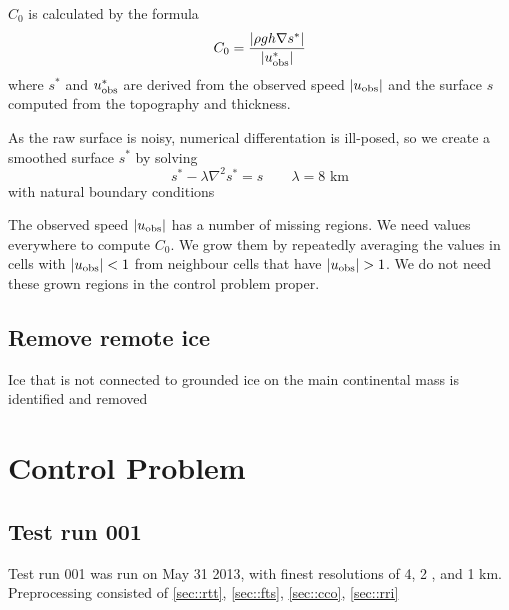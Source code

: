 \documentclass{article}
\newcommand{\usrf}{s}
\newcommand{\thk}{h}
\begin{document}
$C_0$ is calculated by the formula
\begin{equation}
C_0 = \frac{\left | \rho g \thk \nabla{\usrf^{*}}  \right |}{ \left | u_{\rm obs}^{*}  \right | }
\end{equation}
where $\usrf^{*}$ and $u_{\rm obs}^{*}$ are derived from the observed speed $\left| u_{\rm obs} \right |$
and the surface $\usrf$ computed from the topography and thickness.

As the raw surface is noisy, numerical differentation is ill-posed, so we create a smoothed
surface $\usrf^{*}$ by solving
\begin{equation}
\usrf^{*} - \lambda \nabla^2 \usrf^{*} = \usrf \qquad \lambda = 8 \mbox{~km}
\end{equation}
with natural boundary conditions

The observed speed $\left| u_{\rm obs} \right |$ has a number of missing regions.
We need values everywhere to compute $C_0$. We grow them by repeatedly averaging
the values in cells with $\left| u_{\rm obs} \right | < 1$  from neighbour cells 
that have $\left| u_{\rm obs} \right | > 1$. We do not need these grown regions in the control problem proper. 

\subsection{\label{sec::rri} Remove remote ice}

Ice that is not connected to grounded ice on the main continental mass 
is identified and removed

\section{Control Problem}


\subsection{Test run 001}

Test run 001 was run on May 31 2013, with finest resolutions of 4, 2 , and 1 km.
Preprocessing consisted of \ref{sec::rtt}, \ref{sec::fts}, \ref{sec::cco}, \ref{sec::rri}
\end{document}
